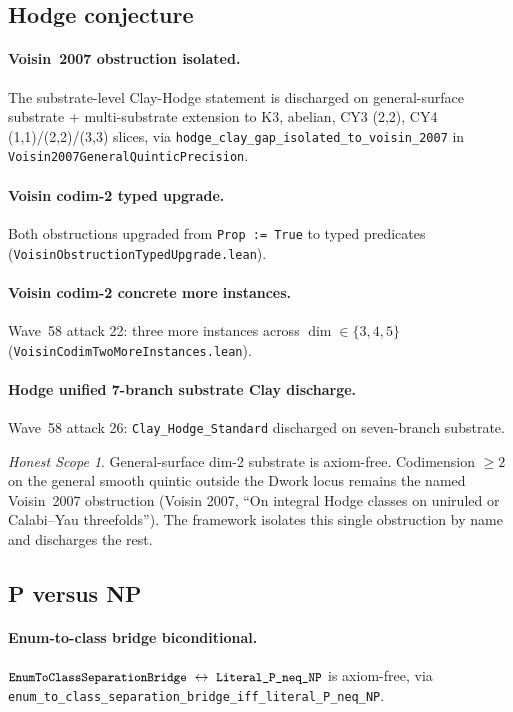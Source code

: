\documentclass[11pt,a4paper]{article}
\theoremstyle{definition}
\theoremstyle{remark}
\newtheorem{honestscope}[theorem]{Honest Scope}
\newcommand{\lean}[1]{\texttt{\small #1}}
\begin{document}
\subsection{Hodge conjecture}
\label{sec:hodge}

\paragraph{Voisin~2007 obstruction isolated.}
The substrate-level Clay-Hodge statement is discharged on
general-surface substrate $+$ multi-substrate extension to K3,
abelian, CY3 (2,2), CY4 (1,1)/(2,2)/(3,3) slices, via
\lean{hodge\_clay\_gap\_isolated\_to\_voisin\_2007} in
\lean{Voisin2007GeneralQuinticPrecision}.

\paragraph{Voisin codim-2 typed upgrade.}
Both obstructions upgraded from \texttt{Prop := True} to typed
predicates (\lean{VoisinObstructionTypedUpgrade.lean}).

\paragraph{Voisin codim-2 concrete more instances.}
Wave~58 attack 22: three more instances across
$\dim \in \{3, 4, 5\}$ (\lean{VoisinCodimTwoMoreInstances.lean}).

\paragraph{Hodge unified 7-branch substrate Clay discharge.}
Wave~58 attack 26: \lean{Clay\_Hodge\_Standard} discharged on
seven-branch substrate.

\begin{honestscope}\label{hs:hodge}
General-surface dim-2 substrate is axiom-free. Codimension $\ge 2$
on the general smooth quintic outside the Dwork locus remains the
named Voisin~2007 obstruction (Voisin 2007, ``On integral Hodge
classes on uniruled or Calabi--Yau threefolds''). The framework
isolates this single obstruction by name and discharges the rest.
\end{honestscope}

\subsection{P versus NP}
\label{sec:pnp}

\paragraph{Enum-to-class bridge biconditional.}
\(
  \lean{EnumToClassSeparationBridge}
  \;\leftrightarrow\;
  \lean{Literal\_P\_neq\_NP}
\)
is axiom-free, via
\lean{enum\_to\_class\_separation\_bridge\_iff\_literal\_P\_neq\_NP}.
\end{document}
